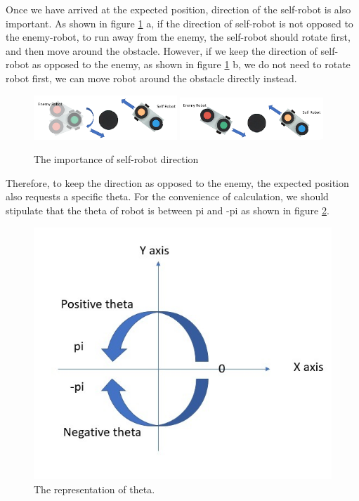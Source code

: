 Once we have arrived at the expected position, direction of the self-robot is also important. As shown in figure \ref{hiding_implement3} a, if the direction of self-robot is not opposed to the enemy-robot, to run away from the enemy, the self-robot should rotate first, and then move around the obstacle. However, if we keep the direction of self-robot as opposed to the enemy, as shown in figure \ref{hiding_implement3} b, we do not need to rotate robot first, we can move robot around the obstacle directly instead.
\begin{figure}[htbp]
\centering
\includegraphics[width =0.48\textwidth]{images/implementofhiding3-1.png}
\includegraphics[width =0.48\textwidth]{images/implementofhiding3-2.png}
\caption{The importance of self-robot direction}\label{hiding_implement3}
\end{figure}

Therefore, to keep the direction as opposed to the enemy, the expected position also requests a specific theta.  For the convenience of calculation, we should stipulate that the theta of robot is between pi and -pi as shown in figure \ref{hiding_implement4}.

\begin{figure}[thb]
    \centering
    \includegraphics[width=1\textwidth]{images/implementofhiding4.png}
    \caption[The representation of theta]{The representation of theta.}\label{hiding_implement4}
\end{figure}



